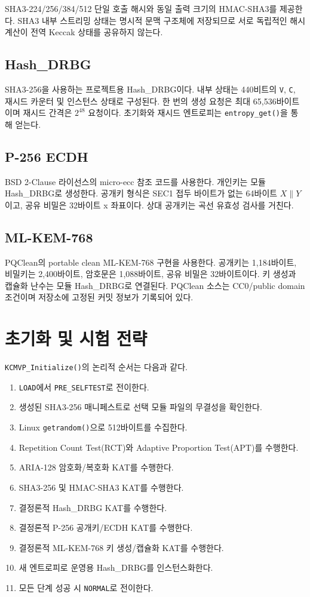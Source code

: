 \documentclass[11pt,a4paper]{article}
\begin{document}
SHA3-224/256/384/512 단일 호출 해시와 동일 출력 크기의 HMAC-SHA3를
제공한다. SHA3 내부 스트리밍 상태는 명시적 문맥 구조체에 저장되므로 서로
독립적인 해시 계산이 전역 Keccak 상태를 공유하지 않는다.

\subsection{Hash\_DRBG}

SHA3-256을 사용하는 프로젝트용 Hash\_DRBG이다. 내부 상태는 440비트의
\texttt{V}, \texttt{C}, 재시드 카운터 및 인스턴스 상태로 구성된다. 한 번의
생성 요청은 최대 65,536바이트이며 재시드 간격은 $2^{48}$ 요청이다.
초기화와 재시드 엔트로피는 \texttt{entropy\_get()}을 통해 얻는다.

\subsection{P-256 ECDH}

BSD 2-Clause 라이선스의 micro-ecc 참조 코드를 사용한다. 개인키는 모듈
Hash\_DRBG로 생성한다. 공개키 형식은 SEC1 접두 바이트가 없는 64바이트
$X \parallel Y$이고, 공유 비밀은 32바이트 x 좌표이다. 상대 공개키는 곡선
유효성 검사를 거친다.

\subsection{ML-KEM-768}

PQClean의 portable clean ML-KEM-768 구현을 사용한다. 공개키는 1,184바이트,
비밀키는 2,400바이트, 암호문은 1,088바이트, 공유 비밀은 32바이트이다.
키 생성과 캡슐화 난수는 모듈 Hash\_DRBG로 연결된다. PQClean 소스는
CC0/public domain 조건이며 저장소에 고정된 커밋 정보가 기록되어 있다.

\section{초기화 및 시험 전략}

\texttt{KCMVP\_Initialize()}의 논리적 순서는 다음과 같다.

\begin{enumerate}
  \item \texttt{LOAD}에서 \texttt{PRE\_SELFTEST}로 전이한다.
  \item 생성된 SHA3-256 매니페스트로 선택 모듈 파일의 무결성을 확인한다.
  \item Linux \texttt{getrandom()}으로 512바이트를 수집한다.
  \item Repetition Count Test(RCT)와 Adaptive Proportion Test(APT)를 수행한다.
  \item ARIA-128 암호화/복호화 KAT를 수행한다.
  \item SHA3-256 및 HMAC-SHA3 KAT를 수행한다.
  \item 결정론적 Hash\_DRBG KAT를 수행한다.
  \item 결정론적 P-256 공개키/ECDH KAT를 수행한다.
  \item 결정론적 ML-KEM-768 키 생성/캡슐화 KAT를 수행한다.
  \item 새 엔트로피로 운영용 Hash\_DRBG를 인스턴스화한다.
  \item 모든 단계 성공 시 \texttt{NORMAL}로 전이한다.
\end{enumerate}
\end{document}
